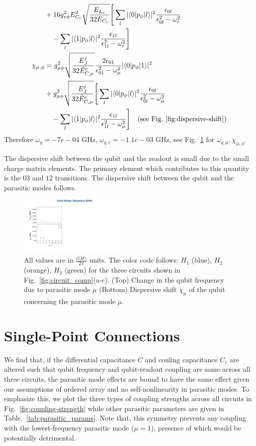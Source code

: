 \documentclass[prx,showpacs,notitlepage,twocolumn,superscriptaddress,nofootinbib,preprintnumbers,floatfix]{revtex4-2}
\begin{document}
{\begin{align}
   &+16g_{r\phi}^2E_{C_r}^2\sqrt{\frac{E_{L_r}}{32E_{C_r}}}\Bigg[\sum_l|\langle 0|p_\phi|l \rangle|^2\frac{\epsilon_{0l}}{\epsilon_{0l}^2-\omega_r^2}\nonumber\\&\quad-\sum_l|\langle 1|p_\phi|l \rangle|^2\frac{\epsilon_{1l}}{\epsilon_{1l}^2-\omega_r^2}\Bigg] \\
   \chi_{\mu,\phi}&=g_{\mu\phi}^2\sqrt{\frac{E_J^j}{32\tilde{E}_{C,\mu}^e}}\frac{2\epsilon_{01}}{\epsilon_{01}^2-\omega_\mu^2}|\langle 0|p_\phi|1 \rangle|^2\nonumber\\
   &+g_{\mu\phi}^2\sqrt{\frac{E_J^j}{32\tilde{E}_{C,\mu}^e}}\Bigg[\sum_l|\langle 0|p_\phi|l \rangle|^2\frac{\epsilon_{0l}}{\epsilon_{0l}^2-\omega_\mu^2}\nonumber\\&\quad-\sum_l|\langle 1|p_\phi|l \rangle|^2\frac{\epsilon_{1l}}{\epsilon_{1l}^2-\omega_\mu^2}\Bigg]
   \quad\text{(see Fig.~\ref{fig:dispersive-shift})}
\end{align}
}
Therefore $\omega_q=-7e-04$ GHz, $\omega_{q,r}=-1.1e-03$ GHz, see Fig.~\ref{fig:dispersive-shift} for $\omega_{q,\mu},\chi_{\mu,\phi}$.
   
The dispersive shift between the qubit and the readout is small due to the small charge matrix elements. The primary element which contributes to this quantity is the $03$ and $12$ transitions. The dispersive shift between the qubit and the parasitic modes follows.
\begin{figure}[htb]
    \centering
    \includegraphics[width=0.45\textwidth]{Figures/dispersive-shift.pdf}
    \caption{All values are in $\frac{GHz}{2\pi}$ units. The color code follows: $H_1$ (blue), $H_2$ (orange), $H_3$ (green) for the three circuits shown in Fig.~\ref{fig:circuit_comp}(a-c). (Top) Change in the qubit frequency due to parasitic mode $\mu$ (Bottom) Dispersive shift $\chi_\mu$ of the qubit concerning the parasitic mode $\mu$.}
    \label{fig:dispersive-shift}
\end{figure}
\section{Single-Point Connections}\label{app:alt_circuits}
We find that, if the differential capacitance $C$ and couling capacitance $C_c$ are altered such that qubit frequency and qubit-readout coupling are same across all three circuits, the parasitic mode effects are bound to have the same effect given our assumptions of ordered array and no self-nonlinearity in parasitic modes. To emphasize this, we plot the three types of coupling strengths across all circuits in Fig.~\ref{fig:coupling-strength} while other parasitic parameters are given in Table.~\ref{tab:parasitic_params}. Note that, this symmetry prevents any coupling with the lowest-frequency parasitic mode ($\mu=1$), presence of which would be potentially detrimental. 
\end{document}
